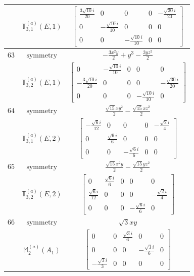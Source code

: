 \documentclass[fleqn,8pt,landscape]{jsarticle}
\begin{document}
\begin{longtable}{ccc}
$  $ & $ \mathbb{T}_{3,1}^{(a)}(E,1) $ & $ \begin{bmatrix} \frac{3 \sqrt{10} i}{20} & 0 & 0 & 0 & - \frac{\sqrt{30} i}{20} \\ 0 & - \frac{\sqrt{10} i}{10} & 0 & 0 & 0 \\ 0 & 0 & - \frac{\sqrt{10} i}{10} & 0 & 0 \end{bmatrix} $ \\ \hline
$ 63 $ & $ \text{symmetry} $ & $ - \frac{3 x^{2} y}{2} + y^{3} - \frac{3 y z^{2}}{2} $ \\
$  $ & $ \mathbb{T}_{3,2}^{(a)}(E,1) $ & $ \begin{bmatrix} 0 & - \frac{\sqrt{10} i}{10} & 0 & 0 & 0 \\ - \frac{3 \sqrt{10} i}{20} & 0 & 0 & 0 & - \frac{\sqrt{30} i}{20} \\ 0 & 0 & 0 & - \frac{\sqrt{10} i}{10} & 0 \end{bmatrix} $ \\ \hline
$ 64 $ & $ \text{symmetry} $ & $ \frac{\sqrt{15} x y^{2}}{2} - \frac{\sqrt{15} x z^{2}}{2} $ \\
$  $ & $ \mathbb{T}_{3,1}^{(a)}(E,2) $ & $ \begin{bmatrix} - \frac{\sqrt{6} i}{12} & 0 & 0 & 0 & - \frac{\sqrt{2} i}{4} \\ 0 & \frac{\sqrt{6} i}{6} & 0 & 0 & 0 \\ 0 & 0 & - \frac{\sqrt{6} i}{6} & 0 & 0 \end{bmatrix} $ \\ \hline
$ 65 $ & $ \text{symmetry} $ & $ \frac{\sqrt{15} x^{2} y}{2} - \frac{\sqrt{15} y z^{2}}{2} $ \\
$  $ & $ \mathbb{T}_{3,2}^{(a)}(E,2) $ & $ \begin{bmatrix} 0 & \frac{\sqrt{6} i}{6} & 0 & 0 & 0 \\ \frac{\sqrt{6} i}{12} & 0 & 0 & 0 & - \frac{\sqrt{2} i}{4} \\ 0 & 0 & 0 & - \frac{\sqrt{6} i}{6} & 0 \end{bmatrix} $ \\ \hline
$ 66 $ & $ \text{symmetry} $ & $ \sqrt{3} x y $ \\
$  $ & $ \mathbb{M}_{2}^{(a)}(A_{1}) $ & $ \begin{bmatrix} 0 & 0 & \frac{\sqrt{3} i}{6} & 0 & 0 \\ 0 & 0 & 0 & - \frac{\sqrt{3} i}{6} & 0 \\ - \frac{\sqrt{3} i}{3} & 0 & 0 & 0 & 0 \end{bmatrix} $ \\ \hline

\end{longtable}
\end{document}
